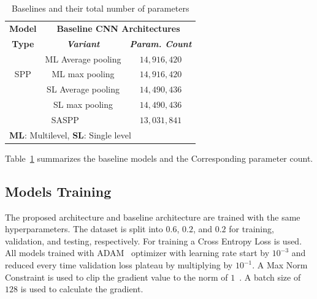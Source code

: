 \begin{table}[htbp]
\caption{Baselines and their total number of parameters}
\begin{center}
\begin{tabular}{|c|c|c|}
\hline
\textbf{Model}&\multicolumn{2}{|c|}{\textbf{Baseline CNN Architectures}} \\
\cline{2-3} 
\textbf{Type} & \textbf{\textit{Variant}}& \textbf{\textit{Param. Count}} \\
\hline
  & ML Average pooling & $14,916,420$   \\
\cline{2-3} 
SPP & ML max pooling & $14,916,420$   \\
\cline{2-3} 
  & SL Average pooling & $14,490,436$   \\
\cline{2-3} 
  & SL max pooling & $14,490,436$ \\
\hline
\multicolumn{2}{|c|}{SASPP} & $13,031,841$\\
\hline
\multicolumn{3}{l}{ \textbf{ML}: Multilevel, \textbf{SL}: Single level}
\end{tabular}
\label{Basarch}
\end{center}
\end{table}
Table~\ref{Basarch} summarizes the baseline models and the Corresponding parameter count.
\subsection{Models Training}
The proposed architecture and baseline architecture are trained with the same hyperparameters. The dataset is split into $0.6$, $0.2$, and $0.2$ for training, validation, and testing, respectively. For training a Cross Entropy Loss is used. All models trained with ADAM~\cite{kingma2014adam} optimizer with learning rate start by $10^{-3}$ and reduced every time validation loss plateau by multiplying by $10^{-1}$. A Max Norm Constraint is used to clip the gradient value to the norm of $1$~\cite{krizhevsky2012imagenet}. A batch size of $128$ is used to calculate the gradient.
